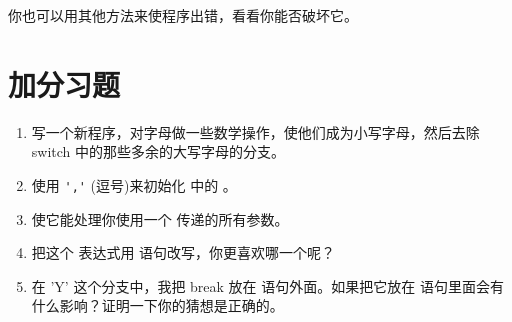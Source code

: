 你也可以用其他方法来使程序出错，看看你能否破坏它。

\section{加分习题}
\begin{enumerate}
\item 写一个新程序，对字母做一些数学操作，使他们成为小写字母，然后去除 switch 中的那些多余的大写字母的分支。
\item 使用 \verb|','| (逗号)来初始化 中的 。
\item 使它能处理你使用一个 传递的所有参数。
\item 把这个  表达式用  语句改写，你更喜欢哪一个呢？
\item 在 'Y' 这个分支中，我把 break 放在  语句外面。如果把它放在
 语句里面会有什么影响？证明一下你的猜想是正确的。
\end{enumerate}

